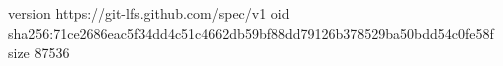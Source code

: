 version https://git-lfs.github.com/spec/v1
oid sha256:71ce2686eac5f34dd4c51c4662db59bf88dd79126b378529ba50bdd54c0fe58f
size 87536
